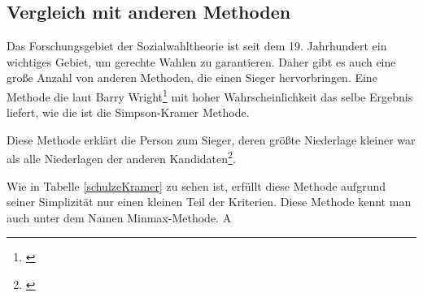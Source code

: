 \subsection{Vergleich mit anderen Methoden}
\label{sec:alternativeAlgorithmen}

Das Forschungsgebiet der Sozialwahltheorie ist seit dem 19. Jahrhundert ein wichtiges Gebiet, um gerechte Wahlen zu garantieren. Daher gibt es auch eine große Anzahl von anderen Methoden, die einen Sieger hervorbringen. Eine Methode die laut Barry Wright\footnote{\Vgl \citet{Wright2009}} mit hoher Wahrscheinlichkeit das selbe Ergebnis liefert, wie die \schulze ist die Simpson-Kramer Methode.

Diese Methode erklärt die Person zum Sieger, deren größte Niederlage kleiner war als alle Niederlagen der anderen Kandidaten\footnote{\Vgl \citet{Nurmi2017}}.  

Wie in Tabelle \ref{schulzeKramer} zu sehen ist, erfüllt diese Methode aufgrund seiner Simplizität nur einen kleinen Teil der Kriterien. Diese Methode kennt man auch unter dem Namen Minmax-Methode. A


